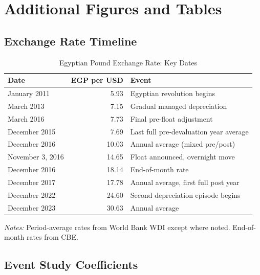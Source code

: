 \documentclass[12pt]{article}
\begin{document}
\section{Additional Figures and Tables}
\label{sec:additional_appendix}

\subsection{Exchange Rate Timeline}

\begin{table}[H]
\centering
\caption{Egyptian Pound Exchange Rate: Key Dates}
\label{tab:exrate}
\begin{threeparttable}
\begin{tabular}{lrl}
\toprule
Date & EGP per USD & Event \\
\midrule
January 2011 & 5.93 & Egyptian revolution begins \\
March 2013 & 7.15 & Gradual managed depreciation \\
March 2016 & 7.73 & Final pre-float adjustment \\
December 2015 & 7.69 & Last full pre-devaluation year average \\
December 2016 & 10.03 & Annual average (mixed pre/post) \\
November 3, 2016 & 14.65 & Float announced, overnight move \\
December 2016 & 18.14 & End-of-month rate \\
December 2017 & 17.78 & Annual average, first full post year \\
December 2022 & 24.60 & Second depreciation episode begins \\
December 2023 & 30.63 & Annual average \\
\bottomrule
\end{tabular}
\begin{tablenotes}[flushleft]
\small
\item \textit{Notes:} Period-average rates from World Bank WDI except where noted. End-of-month rates from CBE.
\end{tablenotes}
\end{threeparttable}
\end{table}

\subsection{Event Study Coefficients}
\end{document}
